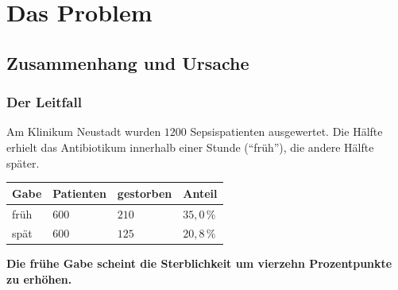 \part{Das Problem}

\chapter{Zusammenhang und Ursache}

\section{Der Leitfall}

\begin{merksatz}
Am Klinikum Neustadt wurden $1200$ Sepsispatienten ausgewertet. Die Hälfte erhielt das Antibiotikum innerhalb einer Stunde (\enquote{früh}), die andere Hälfte später.

\begin{center}
{\small
\renewcommand{\arraystretch}{1.5}
\begin{tabular}{@{}P{2.4cm}P{2.0cm}P{2.0cm}P{2.2cm}@{}}
\toprule
\textbf{Gabe} & \textbf{Patienten} & \textbf{gestorben} & \textbf{Anteil}\\
\midrule
früh & $600$ & $210$ & $35{,}0\,\%$\\
spät & $600$ & $125$ & $20{,}8\,\%$\\
\bottomrule
\end{tabular}}
\end{center}

\begin{center}
\begin{minipage}{0.9\textwidth}
\textbf{Die frühe Gabe scheint die Sterblichkeit um vierzehn Prozentpunkte zu erhöhen.}
\end{minipage}
\end{center}

\begin{center}
\begin{minipage}{0.88\textwidth}
\end{minipage}
\end{center}
\end{merksatz}

